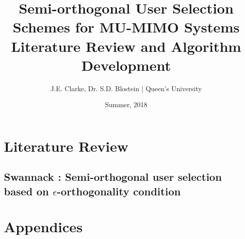 \documentclass[11pt]{article}
\title{Semi-orthogonal User Selection Schemes for MU-MIMO Systems\\ Literature Review and Algorithm Development}
\author{J.E. Clarke, Dr. S.D. Blostein | Queen's University}
\date{Summer, 2018}
\begin{document}
	\maketitle
	\newpage
    \section{Literature Review}
    
        \subsection{Swannack \cite{1549555}: Semi-orthogonal user selection based on $\epsilon$-orthogonality condition}
            
            
    
	\section{Appendices}
\end{document}
